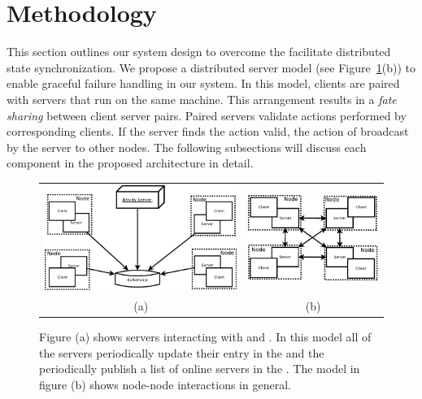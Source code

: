 
\section{Methodology}
\label{sec:methodology}

	This section outlines our system design to overcome the facilitate distributed state synchronization. We propose a distributed server model (see Figure~\ref{figure:server-models}(b)) to enable graceful failure handling in our system. In this model, clients are paired with servers that run on the same machine. This arrangement results in a \emph{fate sharing} between client server pairs. Paired servers validate actions performed by corresponding clients. If the server finds the action valid, the action of broadcast by the server to other nodes. The following subsections will discuss each component in the proposed architecture in detail.

\begin{figure}[ht]
	\centering
	\begin{tabular}{c c}
		
		\includegraphics[width=0.52\linewidth]{../images/client-distributed-server-model-Activity-crop.pdf} &
		\includegraphics[width=0.40\linewidth]{../images/client-distributed-server-model-crop.pdf} \\
		(a) & (b)
	\end{tabular}
	
	\caption{\label{figure:server-models} Figure (a) shows servers interacting with \activityServer and \kvService. In this model all of the servers periodically update their entry in the \kvService and the \activityServer periodically publish a list of online servers in the \kvService. The model in figure (b) shows node-node interactions in general.}
\end{figure}


